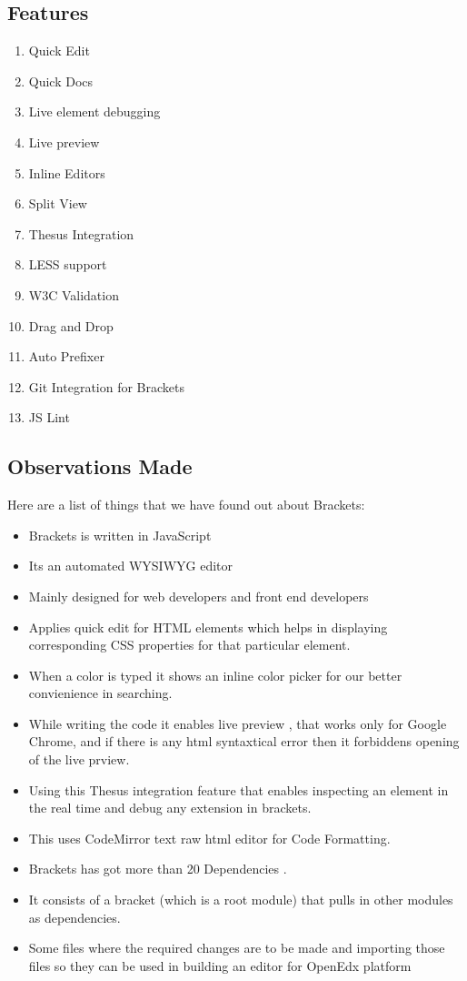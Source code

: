 \subsection{Features}
\begin{enumerate}
\item Quick Edit
\item Quick Docs
\item Live element debugging
\item Live preview
\item Inline Editors
\item Split View
\item Thesus Integration
\item LESS support
\item W3C Validation
\item Drag and Drop
\item Auto Prefixer
\item Git Integration for Brackets
\item JS Lint
\end{enumerate}
\subsection{Observations Made}
Here are a list of things that we have found out about Brackets: \newline
\begin{itemize}
\item Brackets is written in JavaScript
\item Its an automated WYSIWYG editor
\item Mainly designed for web developers and front end developers
\item Applies quick edit for HTML elements which helps in displaying corresponding CSS
properties for that particular element.
\item When a color is typed it shows an inline color picker for our better convienience in
searching.
\item While writing the code it enables live preview , that works only for Google Chrome, and if
there is any html syntaxtical error then it forbiddens opening of the live prview.
\item Using this Thesus integration feature that enables inspecting an element in the real time and
debug any extension in brackets.
\item This uses CodeMirror text raw html editor for Code Formatting.
\item Brackets has got more than 20 Dependencies .
\item It consists of a bracket (which is a root module) that pulls in other modules as dependencies.
\item Some files where the required changes are to be made and importing those files so they can
be used in building an editor for OpenEdx platform
\end{itemize}
